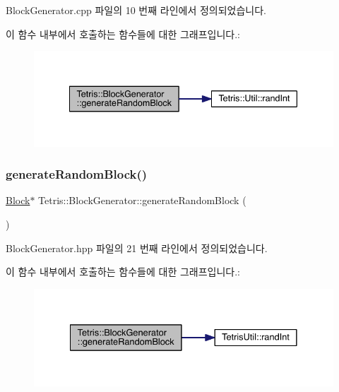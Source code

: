 Block\+Generator.\+cpp 파일의 10 번째 라인에서 정의되었습니다.

이 함수 내부에서 호출하는 함수들에 대한 그래프입니다.\+:
\nopagebreak
\begin{figure}[H]
\begin{center}
\leavevmode
\includegraphics[width=338pt]{class_tetris_1_1_block_generator_a10dfe1467d40437ad41c5ae76437ad78_cgraph}
\end{center}
\end{figure}
\mbox{\label{class_tetris_1_1_block_generator_a434df5baf3944a534492b63763b532a6}} 
\subsubsection{\texorpdfstring{generate\+Random\+Block()}{generateRandomBlock()}\hspace{0.1cm}{\footnotesize\ttfamily [2/2]}}
{\footnotesize\ttfamily \hyperlink{class_tetris_1_1_block}{Block}$\ast$ Tetris\+::\+Block\+Generator\+::generate\+Random\+Block (\begin{DoxyParamCaption}{ }\end{DoxyParamCaption})\hspace{0.3cm}{\ttfamily [inline]}}



Block\+Generator.\+hpp 파일의 21 번째 라인에서 정의되었습니다.

이 함수 내부에서 호출하는 함수들에 대한 그래프입니다.\+:
\nopagebreak
\begin{figure}[H]
\begin{center}
\leavevmode
\includegraphics[width=332pt]{class_tetris_1_1_block_generator_a434df5baf3944a534492b63763b532a6_cgraph}
\end{center}
\end{figure}


